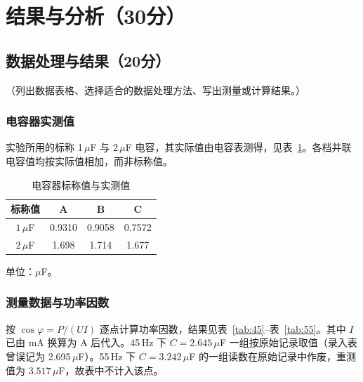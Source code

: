 \documentclass{Phyport}
\begin{document}
\section{结果与分析（30分）}
\subsection{数据处理与结果（20分）}
（列出数据表格、选择适合的数据处理方法、写出测量或计算结果。）

\subsubsection{电容器实测值}

实验所用的标称 1\,$\mu$F 与 2\,$\mu$F 电容，其实际值由电容表测得，见表~\ref{tab:cap}。各档并联电容值均按实际值相加，而非标称值。

\begin{table}[H]
    \centering
    \caption{电容器标称值与实测值}
    \label{tab:cap}
    \begin{tabular}{cccc}
        \toprule
        标称值 & A & B & C \\
        \midrule
        $1\,\mu$F & 0.9310 & 0.9058 & 0.7572 \\
        $2\,\mu$F & 1.698 & 1.714 & 1.677 \\
        \bottomrule
    \end{tabular}

    \vspace{2pt}
    {\small 单位：$\mu$F。}
\end{table}

\subsubsection{测量数据与功率因数}

按 $\cos\varphi=P/(UI)$ 逐点计算功率因数，结果见表~\ref{tab:45}--表~\ref{tab:55}。其中 $I$ 已由 mA 换算为 A 后代入。45\,Hz 下 $C=2.645\,\mu$F 一组按原始记录取值（录入表曾误记为 2.695\,$\mu$F）。55\,Hz 下 $C=3.242\,\mu$F 的一组读数在原始记录中作废，重测值为 $3.517\,\mu$F，故表中不计入该点。
\end{document}
